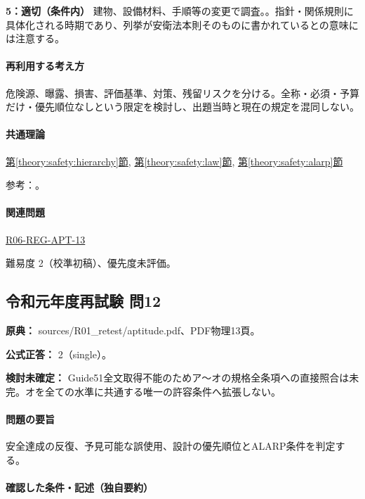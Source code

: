 \noindent\textbf{5：適切（条件内）} 建物、設備材料、手順等の変更で調査。。指針・関係規則に具体化される時期であり、列挙が安衛法本則そのものに書かれているとの意味には注意する。\par

\paragraph{再利用する考え方} 危険源、曝露、損害、評価基準、対策、残留リスクを分ける。全称・必須・予算だけ・優先順位なしという限定を検討し、出題当時と現在の規定を混同しない。

\paragraph{共通理論} \hyperref[theory:safety:hierarchy]{第\ref*{theory:safety:hierarchy}節}, \hyperref[theory:safety:law]{第\ref*{theory:safety:law}節}, \hyperref[theory:safety:alarp]{第\ref*{theory:safety:alarp}節}

\par 参考：\cite{saf_ra2006,saf_chem2016,saf_chemqa}。

\paragraph{関連問題} \hyperref[q:r06-reg-apt-13]{R06-REG-APT-13}

\par 難易度 2（校準初稿）、優先度未評価。

\subsection{令和元年度再試験 問12}
\label{q:r01-ret-apt-12}

\noindent\textbf{原典：} sources/R01\_retest/aptitude.pdf、PDF物理13頁。

\textbf{公式正答：} 2（single）。

\par\textbf{検討未確定：} Guide51全文取得不能のためア〜オの規格全条項への直接照合は未完。オを全ての水準に共通する唯一の許容条件へ拡張しない。

\paragraph{問題の要旨} 安全達成の反復、予見可能な誤使用、設計の優先順位とALARP条件を判定する。

\paragraph{確認した条件・記述（独自要約）}\mbox{}\par

